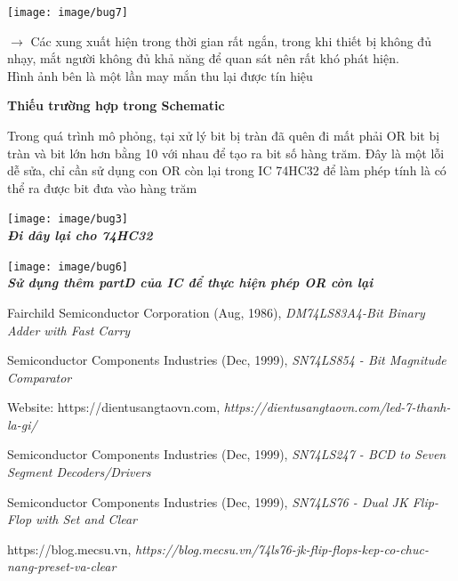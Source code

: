 \documentclass[10pt,a4paper]{report}
\begin{document}
\begin{multicols}{2}
	\begin{center}
		\texttt{[image: image/bug7]}
	\end{center}
	$\to$ Các xung xuất hiện trong thời gian rất ngắn, trong khi thiết bị không đủ nhạy, mắt người không đủ khả năng để quan sát nên rất khó phát hiện.\\
	Hình ảnh bên là một lần may mắn thu lại được tín hiệu
\end{multicols}

\begin{flushleft}
	\textbf{Thiếu trường hợp trong Schematic}
\end{flushleft}
Trong quá trình mô phỏng, tại xử lý bit bị tràn đã quên đi mất phải OR bit bị tràn và bit lớn hơn bằng 10 với nhau để tạo ra bit số hàng trăm. Đây là một lỗi dễ sửa, chỉ cần sử dụng con OR còn lại trong IC 74HC32 để làm phép tính là có thể ra được bit đưa vào hàng trăm
\begin{multicols}{2}
	\begin{center}
		\texttt{[image: image/bug3]}\\
		\textbf{\textit{Đi dây lại cho 74HC32}}
	\end{center}
	\hfill\null\columnbreak
	\begin{center}
		\texttt{[image: image/bug6]}\\
		\textbf{\textit{Sử dụng thêm partD của IC để thực hiện phép OR còn lại}}
	\end{center}
\end{multicols}







\newpage
{}

\begin{thebibliography}{9}
	Fairchild Semiconductor Corporation (Aug, 1986), \textit{DM74LS83A4-Bit Binary Adder with Fast Carry}
	
	Semiconductor Components Industries (Dec, 1999), \textit{SN74LS854 - Bit Magnitude Comparator}
	
	Website: {https://dientusangtaovn.com}, \textit{https://dientusangtaovn.com/led-7-thanh-la-gi/}
	
	Semiconductor Components Industries (Dec, 1999), \textit{SN74LS247 - BCD to Seven Segment Decoders/Drivers}
	
	Semiconductor Components Industries (Dec, 1999), \textit{SN74LS76 - Dual JK Flip-Flop with Set and Clear}
	
	https://blog.mecsu.vn, \textit{https://blog.mecsu.vn/74ls76-jk-flip-flops-kep-co-chuc-nang-preset-va-clear}
\end{thebibliography}
\end{document}
